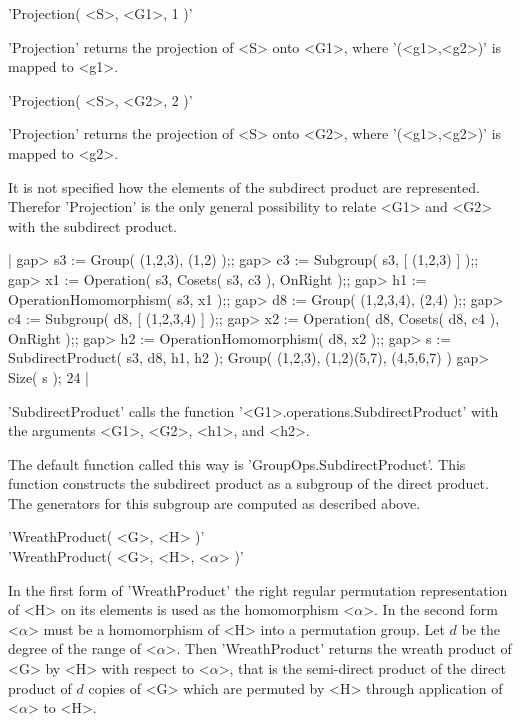 \vspace{5mm}
'Projection( <S>, <G1>, 1 )'%

'Projection' returns the projection of <S> onto <G1>, where '(<g1>,<g2>)'
is mapped to <g1>.

'Projection( <S>, <G2>, 2 )'

'Projection' returns the projection of <S> onto <G2>, where '(<g1>,<g2>)'
is mapped to <g2>.

It  is  not  specified  how  the  elements of the subdirect  product  are
represented.   Therefor  'Projection' is the only general possibility  to
relate <G1> and <G2> with the subdirect product.

|    gap> s3 := Group( (1,2,3), (1,2) );;
    gap> c3 := Subgroup( s3, [ (1,2,3) ] );;
    gap> x1 := Operation( s3, Cosets( s3, c3 ), OnRight );;
    gap> h1 := OperationHomomorphism( s3, x1 );;
    gap> d8 := Group( (1,2,3,4), (2,4) );;
    gap> c4 := Subgroup( d8, [ (1,2,3,4) ] );;
    gap> x2 := Operation( d8, Cosets( d8, c4 ), OnRight );;
    gap> h2 := OperationHomomorphism( d8, x2 );;
    gap> s := SubdirectProduct( s3, d8, h1, h2 );
    Group( (1,2,3), (1,2)(5,7), (4,5,6,7) )
    gap> Size( s );
    24 |

'SubdirectProduct' calls the  function '<G1>.operations.SubdirectProduct'
with the arguments <G1>, <G2>, <h1>, and <h2>.

The  default  function  called  this way  is 'GroupOps.SubdirectProduct'.
This  function  constructs the subdirect product as  a  subgroup  of  the
direct  product.   The  generators for  this  subgroup  are  computed  as
described above.


'WreathProduct( <G>, <H> )' \\
'WreathProduct( <G>, <H>, <$\alpha$> )'

In  the   first form of 'WreathProduct'   the  right  regular permutation
representation   of <H> on  its  elements  is  used as  the  homomorphism
<$\alpha$>.  In the second form <$\alpha$> must be a homomorphism  of <H>
into  a  permutation  group.  Let   $d$ be the  degree  of the range   of
<$\alpha$>.  Then  'WreathProduct'  returns the wreath product  of <G> by
<H> with  respect to <$\alpha$>,  that is the semi-direct product  of the
direct product of $d$  copies of <G> which  are  permuted by  <H> through
application of <$\alpha$> to <H>.

